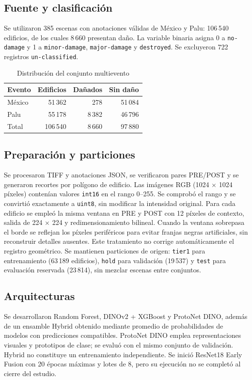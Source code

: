 \documentclass[conference]{IEEEtran}
\begin{document}
\subsection{Fuente y clasificación}
Se utilizaron 385 escenas con anotaciones válidas de México y Palu: 106\,540 edificios, de los cuales 8\,660 presentan daño. La variable binaria asigna 0 a \texttt{no-damage} y 1 a \texttt{minor-damage}, \texttt{major-damage} y \texttt{destroyed}. Se excluyeron 722 registros \texttt{un-classified}.
\begin{table}[t]
\centering
\caption{Distribución del conjunto multievento}
\label{tab:datos}
\begin{tabular}{lrrr}
\toprule
Evento & Edificios & Dañados & Sin daño \\
\midrule
México & 51\,362 & 278 & 51\,084 \\
Palu & 55\,178 & 8\,382 & 46\,796 \\
\midrule
Total & 106\,540 & 8\,660 & 97\,880 \\
\bottomrule
\end{tabular}
\end{table}
\subsection{Preparación y particiones}
Se procesaron TIFF y anotaciones JSON, se verificaron pares PRE/POST y se generaron recortes por polígono de edificio. Las imágenes RGB (1024 $\times$ 1024 píxeles) contenían valores \texttt{int16} en el rango 0--255. Se comprobó el rango y se convirtió exactamente a \texttt{uint8}, sin modificar la intensidad original. Para cada edificio se empleó la misma ventana en PRE y POST con 12 píxeles de contexto, salida de 224 $\times$ 224 y redimensionamiento bilineal. Cuando la ventana sobrepasa el borde se reflejan los píxeles periféricos para evitar franjas negras artificiales, sin reconstruir detalles ausentes. Este tratamiento no corrige automáticamente el registro geométrico. Se mantienen particiones de origen: \texttt{tier1} para entrenamiento (63\,189 edificios), \texttt{hold} para validación (19\,537) y \texttt{test} para evaluación reservada (23\,814), sin mezclar escenas entre conjuntos.
\subsection{Arquitecturas}
Se desarrollaron Random Forest, DINOv2 + XGBoost y ProtoNet DINO, además de un ensamble Hybrid obtenido mediante promedio de probabilidades de modelos con predicciones compatibles. ProtoNet DINO emplea representaciones visuales y prototipos de clase; se evaluó con el mismo conjunto de validación. Hybrid no constituye un entrenamiento independiente. Se inició ResNet18 Early Fusion con 20 épocas máximas y lotes de 8, pero su ejecución no se completó al cierre del estudio.
\end{document}

